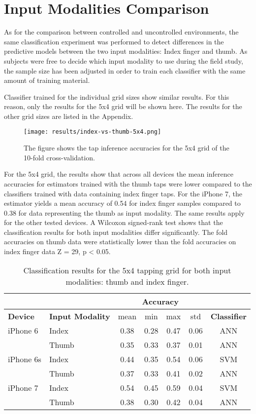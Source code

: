 \section{Input Modalities Comparison}
As for the comparison between controlled and uncontrolled environments, the same classification experiment was performed to detect differences in the predictive models between the two input modalities: Index finger and thumb. As subjects were free to decide which input modality to use during the field study, the sample size has been adjusted in order to train each classifier with the same amount of training material.

Classifier trained for the individual grid sizes show similar results. For this reason, only the results for the 5x4 grid will be shown here. The results for the other grid sizes are listed in the Appendix.

\begin{figure}[h!]
  \centering
  \texttt{[image: results/index-vs-thumb-5x4.png]}
  \caption{The figure shows the tap inference accuracies for the 5x4 grid of the 10-fold cross-validation.} \label{fig:participation}
\end{figure}

For the 5x4 grid, the results show that across all devices the mean inference accuracies for estimators trained with the thumb taps were lower compared to the classifiers trained with data containing index finger taps. For the iPhone 7, the estimator yields a mean accuracy of 0.54 for index finger samples compared to 0.38 for data representing the thumb as input modality. The same results apply for the other tested devices. A Wilcoxon signed-rank test shows that the classification results for both input modalities differ significantly. The fold accuracies on thumb data were statistically lower than the fold accuracies on index finger data Z = 29, p < 0.05.


\begin{table}[h!]
  \centering
\begin{tabular}{|l|l|c|c|c|c|c|}
  \cline{3-6}
  \multicolumn{2}{c}{} & \multicolumn{4}{|c|}{\textbf{Accuracy}}  \\
  \hline
  \textbf{Device} & \textbf{Input Modality} & mean &   min &   max  & std &  \textbf{Classifier} \\
  \hline
  iPhone 6 & Index &      0.38 &     0.28 &     0.47 &     0.06 &  ANN \\
  & Thumb &      0.35 &     0.33 &     0.37 &     0.01 &  ANN \\
  \hline
iPhone 6s & Index &      0.44 &     0.35 &     0.54 &     0.06 &  SVM \\
  & Thumb &      0.37 &     0.33 &     0.41 &     0.02 &  ANN \\
  \hline
  iPhone 7 & Index &      0.54 &     0.45 &     0.59 &     0.04 &  SVM \\
  & Thumb &      0.38 &     0.30 &     0.42 &     0.04 &  ANN \\
  \hline
\end{tabular}
  \caption{Classification results for the 5x4 tapping grid for both input modalities: thumb and index finger.}
\end{table}

